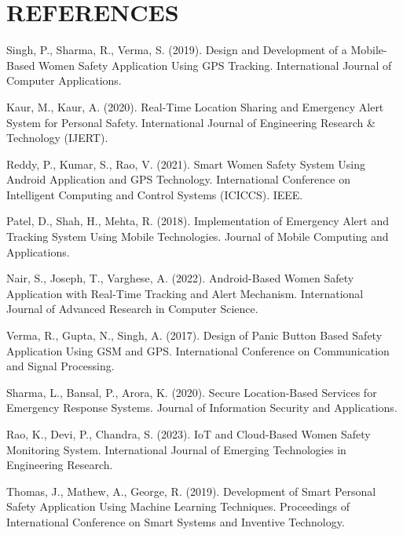 \documentclass[a4paper,12pt]{report}
\begin{document}
\chapter*{REFERENCES}

\begin{enumerate}[label={[\arabic*]}, leftmargin=1.5cm]

\item Singh, P., Sharma, R., Verma, S. (2019). Design and Development of a Mobile-Based Women Safety Application Using GPS Tracking. International Journal of Computer Applications.

\item Kaur, M., Kaur, A. (2020). Real-Time Location Sharing and Emergency Alert System for Personal Safety. International Journal of Engineering Research \& Technology (IJERT).

\item Reddy, P., Kumar, S., Rao, V. (2021). Smart Women Safety System Using Android Application and GPS Technology. International Conference on Intelligent Computing and Control Systems (ICICCS). IEEE.

\item Patel, D., Shah, H., Mehta, R. (2018). Implementation of Emergency Alert and Tracking System Using Mobile Technologies. Journal of Mobile Computing and Applications.

\item Nair, S., Joseph, T., Varghese, A. (2022). Android-Based Women Safety Application with Real-Time Tracking and Alert Mechanism. International Journal of Advanced Research in Computer Science.

\item Verma, R., Gupta, N., Singh, A. (2017). Design of Panic Button Based Safety Application Using GSM and GPS. International Conference on Communication and Signal Processing.

\item Sharma, L., Bansal, P., Arora, K. (2020). Secure Location-Based Services for Emergency Response Systems. Journal of Information Security and Applications.

\item Rao, K., Devi, P., Chandra, S. (2023). IoT and Cloud-Based Women Safety Monitoring System. International Journal of Emerging Technologies in Engineering Research.

\item Thomas, J., Mathew, A., George, R. (2019). Development of Smart Personal Safety Application Using Machine Learning Techniques. Proceedings of International Conference on Smart Systems and Inventive Technology.


\end{enumerate}
\end{document}
